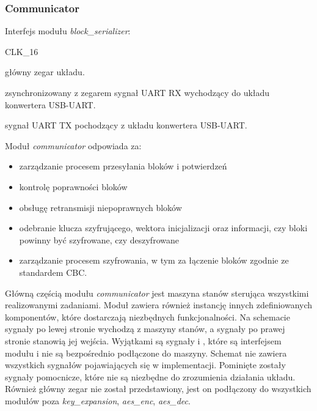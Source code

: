 \subsubsection{Communicator}

Interfejs modułu \textit{block\_serializer}:
\begin{interface}{CLK\_16}
	\item[\insignal{CLK\_16}] główny zegar układu.
	\item[\insignal{RX}] zsynchronizowany z zegarem  sygnał UART RX wychodzący do układu konwertera USB-UART.
	\item[\outsignal{TX}] sygnał UART TX pochodzący z układu konwertera USB-UART.
\end{interface}

Moduł \textit{communicator} odpowiada za:
\begin{itemize}[noitemsep, nolistsep]
\item zarządzanie procesem przesyłania bloków i potwierdzeń
\item kontrolę poprawności bloków
\item obsługę retransmisji niepoprawnych bloków
\item odebranie klucza szyfrującego, wektora inicjalizacji oraz informacji, czy bloki powinny być szyfrowane, czy deszyfrowane
\item zarządzanie procesem szyfrowania, w tym za łączenie bloków zgodnie ze standardem CBC.
\end{itemize}

Główną częścią modułu \textit{communicator} jest maszyna stanów sterująca wszystkimi realizowanymi zadaniami. Moduł zawiera również instancję innych zdefiniowanych komponentów, które dostarczają niezbędnych funkcjonalności. Na schemacie sygnały po lewej stronie wychodzą z maszyny stanów, a sygnały po prawej stronie stanowią jej wejścia. Wyjątkami są sygnały  i , które są interfejsem modułu i nie są bezpośrednio podłączone do maszyny. Schemat nie zawiera wszystkich sygnałów pojawiających się w implementacji. Pominięte zostały sygnały pomocnicze, które nie są niezbędne do zrozumienia działania układu. Również główny zegar nie został przedstawiony, jest on podłączony do wszystkich modułów poza \textit{key\_expansion}, \textit{aes\_enc}, \textit{aes\_dec}.

